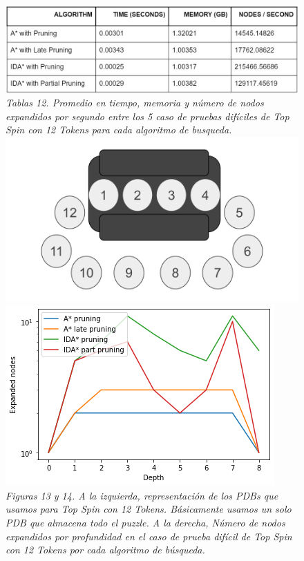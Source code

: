 \documentclass[a4paper,10pt]{article}
\begin{document}
    \begin{figure}[t!]
      \centering
      \includegraphics[scale=0.32]{topspin12T/12ts_tabla_prom.jpg}\\
      \textit{\small{Tablas 12. Promedio en tiempo, memoria y n\'umero de nodos expandidos por segundo entre los 5 caso de pruebas dif\'iciles de Top Spin con 12 Tokens para cada algoritmo de busqueda.}}\\
      \includegraphics[scale=0.2]{topspin12T/pdb.png}
      \includegraphics[scale=0.4]{topspin12T/topspin12.png} \\
      \small{\textit{Figuras 13 y 14. A la izquierda, representaci\'on de los
      PDBs que usamos para Top Spin con 12 Tokens. B\'asicamente
      usamos un solo PDB que almacena todo el puzzle. A la derecha, N\'umero 
      de nodos expandidos por profundidad en el caso de prueba dif\'icil de
      Top Spin con 12 Tokens por cada algoritmo de b\'usqueda.}}
    \end{figure}
\end{document}
